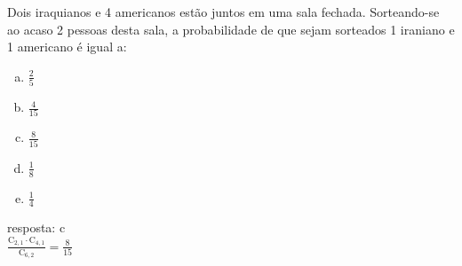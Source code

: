 \begin{ex}
 Dois iraquianos e 4 americanos estão juntos em uma sala fechada. Sorteando-se ao acaso 2 pessoas desta sala, a probabilidade de que sejam sorteados 1 iraniano e 1 americano é igual a:
    \begin{enumerate}[(a)]
    \item $\frac{2}{5}$
    \item $\frac{4}{15}$
    \item $\frac{8}{15}$
    \item $\frac{1}{8}$
    \item $\frac{1}{4}$
    \end{enumerate}
      \begin{sol}
        resposta: c \\
        $\frac{\mathrm{C}_{2,1}\cdot\mathrm{C}_{4,1}}{\mathrm{C}_{6,2}}=\frac{8}{15}$
      \end{sol}
\end{ex}